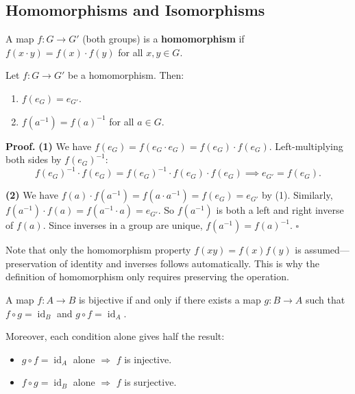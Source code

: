 \documentclass[11pt]{report}
\renewenvironment{proof}[1][Proof]{\noindent\textbf{#1.} }{\hfill$\square$\par\vspace{5pt}}
\begin{document}
\subsection{Homomorphisms and Isomorphisms}

\begin{defbox}[Homomorphism]
A map $f: G \to G'$ (both groups) is a \textbf{homomorphism} if $f(x \cdot y) = f(x) \cdot f(y)$ for all $x, y \in G$.
\end{defbox}

\begin{thmbox}
Let $f: G \to G'$ be a homomorphism. Then:
\begin{enumerate}
    \item $f(e_G) = e_{G'}$.
    \item $f(a^{-1}) = f(a)^{-1}$ for all $a \in G$.
\end{enumerate}
\end{thmbox}

\begin{proof}
\textbf{(1)} We have $f(e_G) = f(e_G \cdot e_G) = f(e_G) \cdot f(e_G)$. Left-multiplying both sides by $f(e_G)^{-1}$:
\[f(e_G)^{-1} \cdot f(e_G) = f(e_G)^{-1} \cdot f(e_G) \cdot f(e_G) \implies e_{G'} = f(e_G).\]

\textbf{(2)} We have $f(a) \cdot f(a^{-1}) = f(a \cdot a^{-1}) = f(e_G) = e_{G'}$ by (1). Similarly, $f(a^{-1}) \cdot f(a) = f(a^{-1} \cdot a) = e_{G'}$. So $f(a^{-1})$ is both a left and right inverse of $f(a)$. Since inverses in a group are unique, $f(a^{-1}) = f(a)^{-1}$.
\end{proof}

\begin{rembox}
Note that only the homomorphism property $f(xy) = f(x)f(y)$ is assumed---preservation of identity and inverses follows automatically. This is why the definition of homomorphism only requires preserving the operation.
\end{rembox}

\begin{propbox}
A map $f: A \to B$ is bijective if and only if there exists a map $g: B \to A$ such that $f \circ g = \operatorname{id}_B$ and $g \circ f = \operatorname{id}_A$.

Moreover, each condition alone gives half the result:
\begin{itemize}[nosep]
    \item $g \circ f = \operatorname{id}_A$ alone $\Rightarrow$ $f$ is injective.
    \item $f \circ g = \operatorname{id}_B$ alone $\Rightarrow$ $f$ is surjective.
\end{itemize}
\end{propbox}
\end{document}
